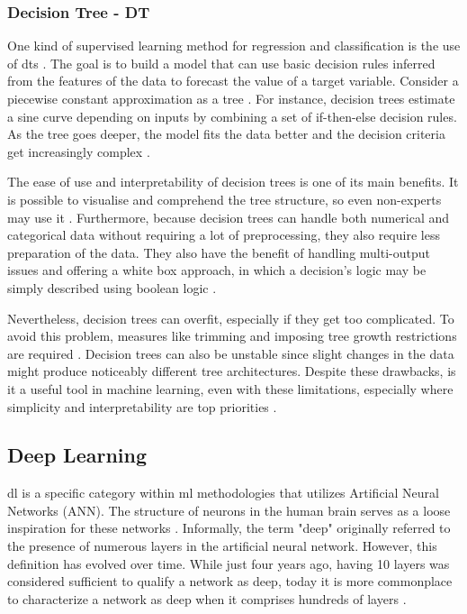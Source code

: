 \subsubsection{Decision Tree - DT}

One kind of supervised learning method for regression and classification is the use of \acfp{dt} \citep{sklearn_dtt}. The goal is to build a model that can use basic decision rules inferred from the features of the data to forecast the value of a target variable. Consider a piecewise constant approximation as a tree \citep{sklearn_dtt}. For instance, decision trees estimate a sine curve depending on inputs by combining a set of if-then-else decision rules. As the tree goes deeper, the model fits the data better and the decision criteria get increasingly complex \citep{sklearn_dtt}.

The ease of use and interpretability of decision trees is one of its main benefits. It is possible to visualise and comprehend the tree structure, so even non-experts may use it \citep{sklearn_dtt}. Furthermore, because decision trees can handle both numerical and categorical data without requiring a lot of preprocessing, they also require less preparation of the data. They also have the benefit of handling multi-output issues and offering a white box approach, in which a decision's logic may be simply described using boolean logic \citep{sklearn_dtt}.

Nevertheless, decision trees can overfit, especially if they get too complicated. To avoid this problem, measures like trimming and imposing tree growth restrictions are required \citep{sklearn_dtt}. Decision trees can also be unstable since slight changes in the data might produce noticeably different tree architectures. Despite these drawbacks, is it a useful tool in machine learning, even with these limitations, especially where simplicity and interpretability are top priorities \citep{sklearn_dtt}.


\subsection{Deep Learning}
\ac{dl} is a specific category within \ac{ml} methodologies that utilizes Artificial Neural Networks (ANN). The structure of neurons in the human brain serves as a loose inspiration for these networks \citep{gulli_deep_2017}. Informally, the term "deep" originally referred to the presence of numerous layers in the artificial neural network. However, this definition has evolved over time. While just four years ago, having 10 layers was considered sufficient to qualify a network as deep, today it is more commonplace to characterize a network as deep when it comprises hundreds of layers \citep{gulli_deep_2017}. 

